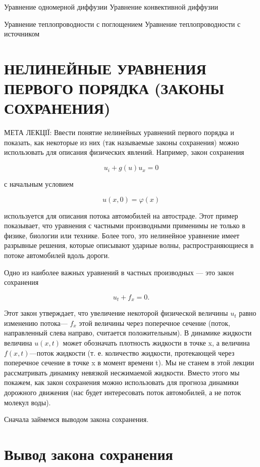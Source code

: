\documentclass[
  ukrainian,
]{article}
\begin{document}
Уравнение одномерной диффузии Уравнение конвективной диффузии

Уравнение теплопроводности с поглощением Уравнение теплопроводности с
источником

\section{НЕЛИНЕЙНЫЕ УРАВНЕНИЯ ПЕРВОГО ПОРЯДКА (ЗАКОНЫ
СОХРАНЕНИЯ)}\label{ux43dux435ux43bux438ux43dux435ux439ux43dux44bux435-ux443ux440ux430ux432ux43dux435ux43dux438ux44f-ux43fux435ux440ux432ux43eux433ux43e-ux43fux43eux440ux44fux434ux43aux430-ux437ux430ux43aux43eux43dux44b-ux441ux43eux445ux440ux430ux43dux435ux43dux438ux44f}

МЕТА ЛЕКЦІЇ: Ввести понятие нелинейных уравнений первого порядка и
показать, как некоторые из них (так называемые законы сохранения) можно
использовать для описания физических явлений. Например, закон сохранения

\[
u_i + g(u)u_x = 0
\]

с начальным условием

\[
u(x, 0) = \varphi(x)
\]

используется для описания потока автомобилей на автостраде. Этот пример
показывает, что уравнения с частными производными применимы не только в
физике, биологии или технике. Более того, это нелинейное уравнение имеет
разрывные решения, которые описывают ударные волны, распространяющиеся в
потоке автомобилей вдоль дороги.

Одно из наиболее важных уравнений в частных производных --- это закон
сохранения

\[
u_t + f_x = 0.
\]

Этот закон утверждает, что увеличение некоторой физической величины
\(u_t\) равно изменению потока--- \(f_x\) этой величины через поперечное
сечение (поток, направленный слева направо, считается положительным). В
динамике жидкости величина \(u(x,t)\) может обозначать плотность
жидкости в точке x, а величина \(f(x,t)\)---поток жидкости (т. е.
количество жидкости, протекающей через поперечное сечение в точке x в
момент времени t). Мы не станем в этой лекции рассматривать динамику
невязкой несжимаемой жидкости. Вместо этого мы покажем, как закон
сохранения можно использовать для прогноза динамики дорожного движения
(нас будет интересовать поток автомобилей, а не поток молекул воды).

Сначала займемся выводом закона сохранения.

\section{Вывод закона
сохранения}\label{ux432ux44bux432ux43eux434-ux437ux430ux43aux43eux43dux430-ux441ux43eux445ux440ux430ux43dux435ux43dux438ux44f}
\end{document}

